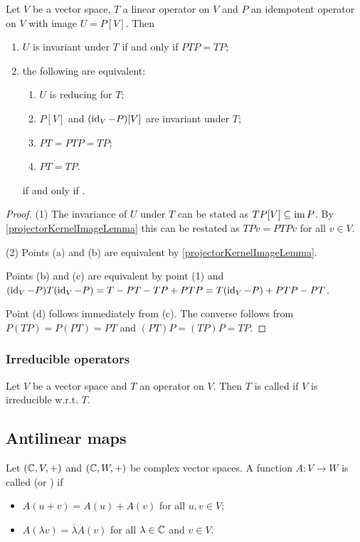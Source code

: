 \begin{lemma}
Let $V$ be a vector space, $T$ a linear operator on $V$ and $P$ an idempotent operator on $V$ with image $U = P[V]$. Then 
\begin{enumerate}
\item $U$ is invariant under $T$ \textup{if and only if} $PTP = TP$;
\item the following are equivalent:
\begin{enumerate}
\item $U$ is reducing for $T$;
\item $P[V]$ and $(\operatorname{id}_V - P)[V]$ are invariant under $T$;
\item $PT = PTP = TP$;
\item $PT = TP$.
\end{enumerate} \textup{if and only if} .
\end{enumerate}
\end{lemma}
\begin{proof}
(1) The invariance of $U$ under $T$ can be stated as $TP[V] \subseteq \operatorname{im} P$. By \ref{projectorKernelImageLemma} this can be restated as $TPv = PTPv$ for all $v\in V$.

(2) Points (a) and (b) are equivalent by \ref{projectorKernelImageLemma}.

Points (b) and (c) are equivalent by point (1) and $(\operatorname{id}_V - P)T(\operatorname{id}_V - P) = T - PT - TP + PTP = T(\operatorname{id}_V - P) + PTP - PT$.

Point (d) follows immediately from (c). The converse follows from $P(TP) = P(PT) = PT$ and $(PT)P = (TP)P = TP$.
\end{proof}

\subsubsection{Irreducible operators}
\begin{definition}
Let $V$ be a vector space and $T$ an operator on $V$. Then $T$ is called  if $V$ is irreducible w.r.t. $T$.
\end{definition}

\subsection{Antilinear maps}
\begin{definition}
Let $\sSet{\C, V, +}$ and $\sSet{\C, W, +}$ be complex vector spaces. A function $A: V\to W$ is called  (or ) if
\begin{itemize}
\item $A(u+v) = A(u) + A(v)$ for all $u,v\in V$;
\item $A(\lambda v) = \overline{\lambda}A(v)$ for all $\lambda \in \mathbb{C}$ and $v\in V$.
\end{itemize}
\end{definition}

